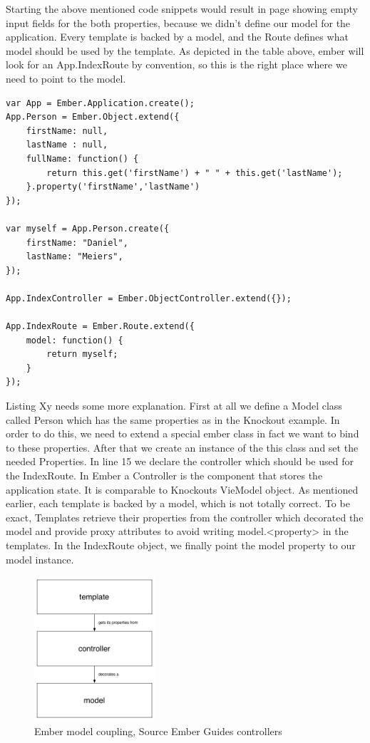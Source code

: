 Starting the above mentioned code snippets would result in page showing empty input fields for the both properties, because we didn't define our model for the application. 
Every template is backed by a model, and the Route defines what model should be used by the template. As depicted in the table above, ember will look for an App.IndexRoute by convention, so this is the right place where we need to point to the model.

\begin{lstlisting}[caption=app.js]
var App = Ember.Application.create();
App.Person = Ember.Object.extend({
	firstName: null,
	lastName : null,
    fullName: function() {
        return this.get('firstName') + " " + this.get('lastName');
    }.property('firstName','lastName')
});

var myself = App.Person.create({
    firstName: "Daniel",
    lastName: "Meiers",
});

App.IndexController = Ember.ObjectController.extend({});

App.IndexRoute = Ember.Route.extend({
    model: function() {
        return myself;
    }
});
\end{lstlisting}

Listing Xy needs some more explanation. First at all we define a Model class called Person which has the same properties as in the Knockout example. In order to do this, we need to extend a special ember class in fact we want to bind to these properties. After that we create an instance of the this class and set the needed Properties. In line 15 we declare the controller which should be used for the IndexRoute. In Ember a Controller is the component that stores the application state. It is comparable to Knockouts VieModel object. As mentioned earlier, each template is backed by a model, which is not totally correct. To be exact, Templates retrieve their properties from the controller which decorated the model and provide proxy attributes to avoid writing model.<property> in the templates. In the IndexRoute object, we finally point the model property to our model instance.

\begin{figure}
	\centering	\includegraphics[width=0.4\textwidth]{./img/ember_controller_coupling.png}
	\caption{Ember model coupling, Source Ember Guides controllers}
	\label{fig:ember_coupling}
\end{figure} 
 

